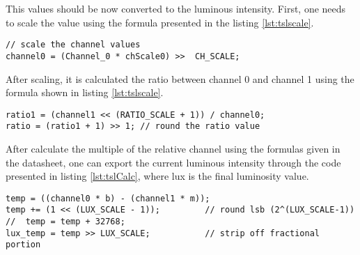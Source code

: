 This values should be now converted to the luminous intensity. First, one needs to scale the value using the formula presented in the listing \ref{lst:tslscale}.

\begin{lstlisting}[caption={TSL2581 Channel 0 scaling.}, label={lst:tslscale}]
// scale the channel values
channel0 = (Channel_0 * chScale0) >>  CH_SCALE;
\end{lstlisting}

After scaling, it is calculated the ratio between channel 0 and channel 1 using the formula shown in listing \ref{lst:tslscale}.

\begin{lstlisting}[caption={TSL2581 ratio calculation.}, label={lst:tslratio}]
ratio1 = (channel1 << (RATIO_SCALE + 1)) / channel0;
ratio = (ratio1 + 1) >> 1; // round the ratio value
\end{lstlisting}

After calculate the multiple of the relative channel using the formulas given in the datasheet, one can export the current luminous intensity through the code presented in listing \ref{lst:tslCalc}, where lux is the final luminosity value. 

\begin{lstlisting}[caption={TSL2581 luminosity value calculation.}, label={lst:tslCalc}]
temp = ((channel0 * b) - (channel1 * m));
temp += (1 << (LUX_SCALE - 1));			// round lsb (2^(LUX_SCALE-1))
//  temp = temp + 32768;
lux_temp = temp >> LUX_SCALE;			// strip off fractional portion
\end{lstlisting}

